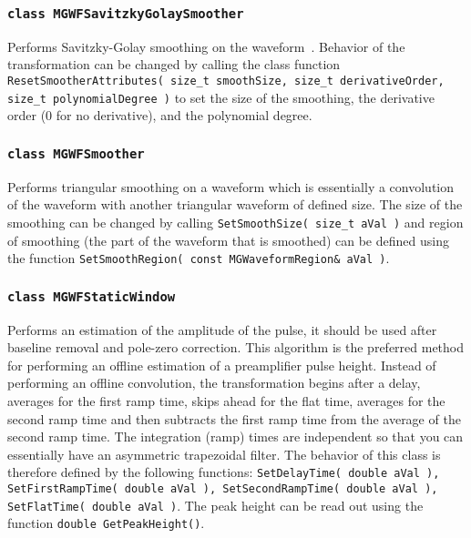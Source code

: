 			\subsubsection{\lstinline!class MGWFSavitzkyGolaySmoother!}
Performs Savitzky-Golay smoothing on the waveform~\cite{Sav64aa}.  
Behavior of the transformation can be changed by calling the class function \lstinline!ResetSmootherAttributes( size_t smoothSize, size_t derivativeOrder, size_t polynomialDegree )! to set the size of the smoothing, the derivative order (0 for no derivative), and the polynomial degree.  

			\subsubsection{\lstinline!class MGWFSmoother!}
Performs triangular smoothing on a waveform which is essentially a convolution of the waveform with another triangular waveform of defined size.  The size of the smoothing can be changed by calling \lstinline!SetSmoothSize( size_t aVal )! and region of smoothing (the part of the waveform that is smoothed) can be defined using the function \lstinline!SetSmoothRegion( const MGWaveformRegion& aVal )!.  

			\subsubsection{\lstinline!class MGWFStaticWindow!}
Performs an estimation of the amplitude of the pulse, it should be used after baseline removal and pole-zero correction.  This algorithm is the preferred method for performing an offline estimation of a preamplifier pulse height.  Instead of performing an offline convolution, the transformation begins after a delay, averages for the first ramp time, skips ahead for the flat time, averages for the second ramp time and then subtracts the first ramp time from the average of the second ramp time.  The integration (ramp) times are independent so that you can essentially have an asymmetric trapezoidal filter.  The behavior of this class is therefore defined by the following functions: \lstinline!SetDelayTime( double aVal ), SetFirstRampTime( double aVal ), SetSecondRampTime( double aVal ), SetFlatTime( double aVal )!.  The peak height can be read out using the function \lstinline!double GetPeakHeight()!.
